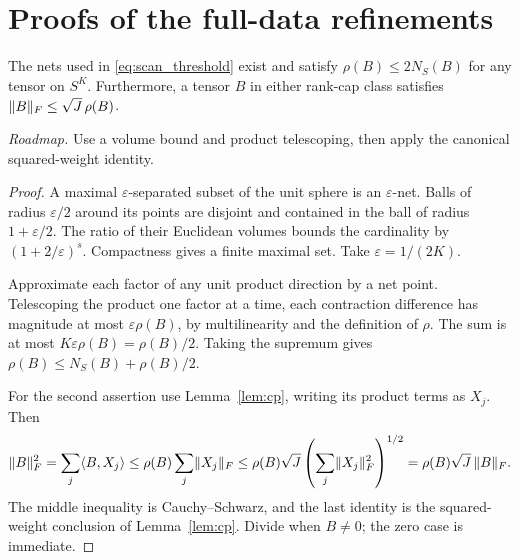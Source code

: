 
\section{Proofs of the full-data refinements}\label{app:full_data_proofs}

\begin{lemma}\label{lem:net_scan}
The nets used in \eqref{eq:scan_threshold} exist and satisfy
$\rho(B)\le2N_S(B)$ for any tensor on $S^K$.
Furthermore, a tensor $B$ in either rank-cap class satisfies
$\lVert B\rVert_F\le\sqrt J\,\rho(B)$.
\end{lemma}
\noindent\emph{Roadmap.} Use a volume bound and product telescoping, then apply the canonical squared-weight identity.
\begin{proof}
A maximal $\varepsilon$-separated subset of the unit sphere is an $\varepsilon$-net. Balls of radius $\varepsilon/2$ around its points are disjoint and contained in the ball of radius $1+\varepsilon/2$. The ratio of their Euclidean volumes bounds the cardinality by $(1+2/\varepsilon)^s$. Compactness gives a finite maximal set. Take $\varepsilon=1/(2K)$.

Approximate each factor of any unit product direction by a net point. Telescoping the product one factor at a time, each contraction difference has magnitude at most $\varepsilon\rho(B)$, by multilinearity and the definition of $\rho$. The sum is at most $K\varepsilon\rho(B)=\rho(B)/2$. Taking the supremum gives $\rho(B)\le N_S(B)+\rho(B)/2$.

For the second assertion use Lemma~\ref{lem:cp}, writing its product terms as $X_j$. Then
\[
 \lVert B\rVert_F^2
 =\sum_j\langle B,X_j\rangle
 \le\rho(B)\sum_j\lVert X_j\rVert_F
 \le\rho(B)\sqrt J
       \left(\sum_j\lVert X_j\rVert_F^2\right)^{1/2}
 =\rho(B)\sqrt J\,\lVert B\rVert_F.
\]
The middle inequality is Cauchy--Schwarz, and the last identity is the squared-weight conclusion of Lemma~\ref{lem:cp}. Divide when $B\ne0$; the zero case is immediate.
\end{proof}

